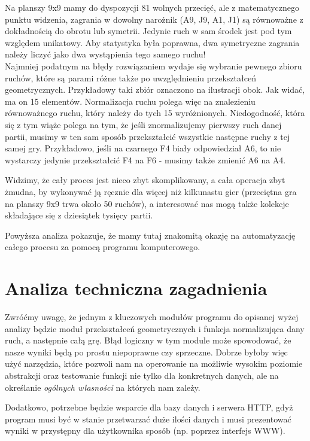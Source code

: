\documentclass[11pt,leqno]{article}
\begin{document}
Na planszy 9x9 mamy do dyspozycji 81 wolnych przecięć, ale z matematycznego punktu widzenia, zagrania w dowolny narożnik 
(A9, J9, A1, J1) są równoważne z dokładnością do obrotu lub symetrii. Jedynie ruch w sam środek jest pod tym względem unikatowy. 
Aby statystyka była poprawna, dwa symetryczne zagrania należy liczyć jako dwa wystąpienia tego samego ruchu! \\ 
Najmniej podatnym  na błędy rozwiązaniem wydaje się wybranie pewnego zbioru ruchów, które są parami różne także po uwzględnieniu przekształceń 
geometrycznych. Przykładowy taki zbiór oznaczono na ilustracji obok. Jak widać, ma on 15 elementów. Normalizacja ruchu polega
 więc na znalezieniu równoważnego ruchu, który należy do tych 15 wyróżnionych. Niedogodność, która się z tym wiąże polega na 
tym, że jeśli znormalizujemy pierwszy ruch danej partii, musimy w ten sam sposób przekształcić wszystkie następne ruchy z tej samej gry. 
Przykładowo, jeśli na czarnego F4 biały odpowiedział A6, to nie wystarczy jedynie przekształcić
F4 na F6 - musimy także zmienić A6 na A4.

Widzimy, że cały proces jest nieco zbyt skomplikowany, a cała operacja zbyt żmudna, by wykonywać ją ręcznie dla więcej niż 
kilkunastu gier (przeciętna gra na planszy 9x9 trwa około 50 ruchów), a interesować nas mogą także kolekcje składające się
 z dziesiątek tysięcy partii.

Powyższa analiza pokazuje, że mamy tutaj znakomitą okazję na automatyzację całego procesu za pomocą programu komputerowego. 

\section{Analiza techniczna zagadnienia}

Zwróćmy uwagę, że jednym z kluczowych modułów programu do opisanej wyżej analizy będzie moduł przekształceń geometrycznych i
 funkcja normalizująca dany ruch, a następnie całą grę. Błąd logiczny w tym module może spowodować, że nasze wyniki będą po prostu 
niepoprawne czy sprzeczne. Dobrze byłoby więc użyć narzędzia, które pozwoli nam na operowanie na możliwie wysokim poziomie
 abstrakcji oraz testowanie funkcji nie tylko dla konkretnych danych, ale na określanie \emph{ogólnych własności} na których nam zależy. 

Dodatkowo, potrzebne będzie wsparcie dla bazy danych i serwera HTTP, gdyż program musi być w stanie przetwarzać duże ilości danych
 i musi prezentować wyniki w przystępny dla użytkownika sposób (np. poprzez interfejs WWW).
\end{document}
